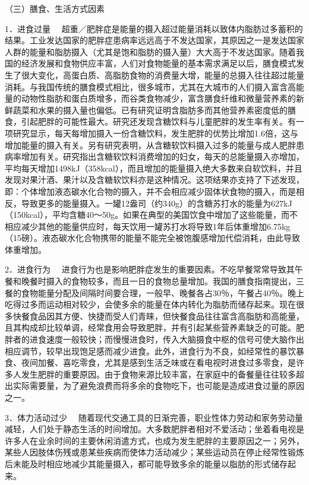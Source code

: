 （三）膳食、生活方式因素

{1．进食过量}
　超重／肥胖症是能量的摄入超过能量消耗以致体内脂肪过多蓄积的结果。工业发达国家的肥胖症患病率远远高于不发达国家，其原因之一是发达国家人群的能量和脂肪摄入（尤其是饱和脂肪的摄入量）大大高于不发达国家。随着我国的经济发展和食物供应丰富，人们对食物能量的基本需求满足以后，膳食模式发生了很大变化，高蛋白质、高脂肪食物的消费量大增，能量的总摄入往往超过能量消耗。与我国传统的膳食模式相比，很多城市，尤其在大城市的人们摄入富含高能量的动物性脂肪和蛋白质增多，而谷类食物减少，富含膳食纤维和微量营养素的新鲜蔬菜和水果的摄入量也偏低。已有研究证明含脂肪多而其他营养素密度低的膳食，引起肥胖的可能性最大。研究还发现含糖饮料与儿童肥胖的发生率有关。有一项研究显示，每天每增加摄入一份含糖饮料，发生肥胖的优势比增加1.6倍，这与增加能量的摄入有关。另有研究表明，从含糖软饮料摄入过多的能量与成人肥胖患病率增加有关。研究指出含糖软饮料消费增加的妇女，每天的总能量摄入亦增加，平均每天增加1498kJ（358kcal），而且增加的能量摄入绝大多数来自软饮料，并且发现对果汁酒、果汁以及含糖软饮料亦是这种情况。这项结果亦支持了下述发现，即：个体增加液态碳水化合物的摄入，并不会相应减少固体状食物的摄入，而是相反，导致更多的能量摄入。一罐12盎司（约340g）的含糖苏打水的能量为627kJ（150kcal），平均含糖40～50g。如果在典型的美国饮食中增加了这些能量，而不相应减少其他的能量供应时，每天饮用一罐苏打水将导致1年后体重增加6.75kg（15磅）。液态碳水化合物携带的能量不能完全被饱腹感增加代偿消耗，由此导致体重增加。

{2．进食行为}
　进食行为也是影响肥胖症发生的重要因素。不吃早餐常常导致其午餐和晚餐时摄入的食物较多，而且一日的食物总量增加。我国的膳食指南提出，三餐的食物能量分配及间隔时间要合理，一般早、晚餐各占30％，午餐占40％。晚上吃得过多而运动相对较少，会使多余的能量在体内转化为脂肪而储存起来。现在很多快餐食品因其方便、快捷而受人们青睐，但快餐食品往往富含高脂肪和高能量，且其构成却比较单调，经常食用会导致肥胖，并有引起某些营养素缺乏的可能。肥胖者的进食速度一般较快；而慢慢进食时，传入大脑摄食中枢的信号可使大脑作出相应调节，较早出现饱足感而减少进食。此外，进食行为不良，如经常性的暴饮暴食、夜间加餐、喜吃零食，尤其是感到生活乏味或在看电视时进食过多零食，是许多人发生肥胖的重要原因。由于食物来源比较丰富，在家庭中的备餐量往往较多超出实际需要量，为了避免浪费而将多余的食物吃下，也可能是造成进食过量的原因之一。

{3．体力活动过少}
　随着现代交通工具的日渐完善，职业性体力劳动和家务劳动量减轻，人们处于静态生活的时间增加。大多数肥胖者相对不爱活动；坐着看电视是许多人在业余时间的主要休闲消遣方式，也成为发生肥胖的主要原因之一；另外，某些人因肢体伤残或患某些疾病而使体力活动减少；某些运动员在停止经常性锻炼后未能及时相应地减少其能量摄入，都可能导致多余的能量以脂肪的形式储存起来。

